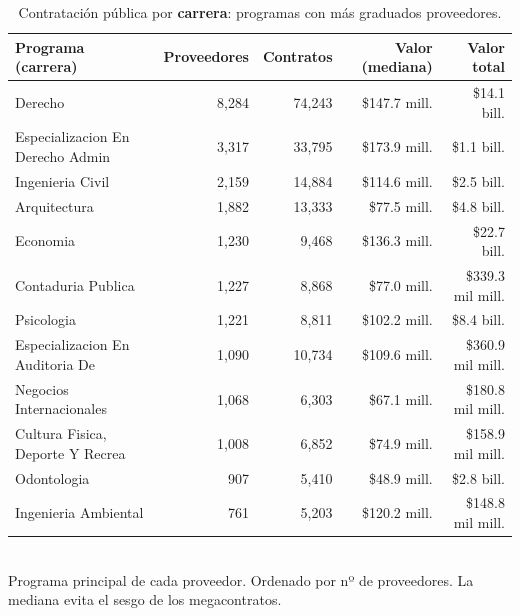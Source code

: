 \begin{table}[H]\centering\footnotesize
\caption{Contratación pública por \textbf{carrera}: programas con más graduados proveedores.}\label{tab:secop_carrera}
\begin{tabular}{lrrrr}
\toprule
\rowcolor{ustaazul}\textbf{\color{white}Programa (carrera)} & \textbf{\color{white}Proveedores} & \textbf{\color{white}Contratos} & \textbf{\color{white}Valor (mediana)} & \textbf{\color{white}Valor total} \\
\midrule
Derecho & 8,284 & 74,243 & \$147.7 mill. & \$14.1 bill. \\
Especializacion En Derecho Admin & 3,317 & 33,795 & \$173.9 mill. & \$1.1 bill. \\
Ingenieria Civil & 2,159 & 14,884 & \$114.6 mill. & \$2.5 bill. \\
Arquitectura & 1,882 & 13,333 & \$77.5 mill. & \$4.8 bill. \\
Economia & 1,230 & 9,468 & \$136.3 mill. & \$22.7 bill. \\
Contaduria Publica & 1,227 & 8,868 & \$77.0 mill. & \$339.3 mil mill. \\
Psicologia & 1,221 & 8,811 & \$102.2 mill. & \$8.4 bill. \\
Especializacion En Auditoria De  & 1,090 & 10,734 & \$109.6 mill. & \$360.9 mil mill. \\
Negocios Internacionales & 1,068 & 6,303 & \$67.1 mill. & \$180.8 mil mill. \\
Cultura Fisica, Deporte Y Recrea & 1,008 & 6,852 & \$74.9 mill. & \$158.9 mil mill. \\
Odontologia & 907 & 5,410 & \$48.9 mill. & \$2.8 bill. \\
Ingenieria Ambiental & 761 & 5,203 & \$120.2 mill. & \$148.8 mil mill. \\
\bottomrule
\end{tabular}
\\[2pt]{\scriptsize\color{ustagris} Programa principal de cada proveedor. Ordenado por nº de proveedores. La mediana evita el sesgo de los megacontratos.}
\end{table}